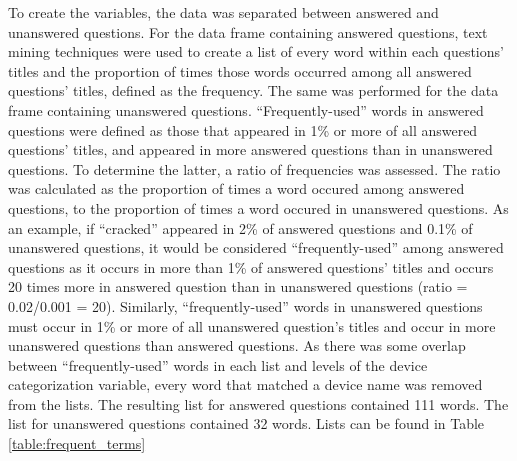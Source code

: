 \documentclass{article}
\begin{document}
To create the variables, the data was separated between answered and unanswered questions. For the data frame containing answered questions, text mining techniques were used to create a list of every word within each questions' titles and the proportion of times those words occurred among all answered questions' titles, defined as the frequency. The same was performed for the data frame containing unanswered questions. ``Frequently-used'' words in answered questions were defined as those that appeared in 1\% or more of all answered questions' titles, and appeared in more answered questions than in unanswered questions. To determine the latter, a ratio of frequencies was assessed. The ratio was calculated as the proportion of times a word occured among answered questions, to the proportion of times a word occured in unanswered questions. As an example, if ``cracked'' appeared in 2\% of answered questions and 0.1\% of unanswered questions, it would be considered ``frequently-used'' among answered questions as it occurs in more than 1\% of answered questions' titles and occurs 20 times more in answered question than in unanswered questions (ratio = 0.02/0.001 = 20). Similarly, ``frequently-used'' words in unanswered questions must occur in 1\% or more of all unanswered question's titles and occur in more unanswered questions than answered questions. As there was some overlap between ``frequently-used'' words in each list and levels of the device categorization variable, every word that matched a device name was removed from the lists. The resulting list for answered questions contained 111 words. The list for unanswered questions contained 32 words. Lists can be found in Table \ref{table:frequent_terms}
\end{document}
